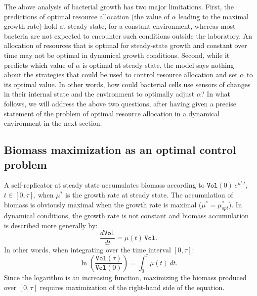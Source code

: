 The above analysis of bacterial growth has two major limitations.
First, the predictions of optimal resource allocation (the value of $\alpha$ leading to the maximal growth rate) hold at steady state, for a constant environment, whereas most bacteria are not expected to encounter such conditions outside the laboratory.
An allocation of resources that is optimal for steady-state growth and constant over time may not be optimal in dynamical growth conditions.
Second, while it predicts which value of $\alpha$ is optimal at steady state, the model says nothing about the strategies that could be used to control resource allocation and set $\alpha$ to its optimal value.
In other words, how could bacterial cells use sensors of changes in their internal state and the environment to optimally adjust $\alpha$?
In what follows, we will address the above two questions, after having given a precise statement of the problem of optimal resource allocation in a dynamical environment in the next section. 

\subsection*{Biomass maximization as an optimal control problem}
\label{sec:optimalcontrolproblem}

A self-replicator at steady state accumulates biomass according to $\texttt{Vol}(0)\, e^{\mu^*\, t}$, $t\in [0,\tau]$, when $\mu^*$ is the growth rate at steady state. 
The accumulation of biomass is obviously maximal when the growth rate is maximal ($\mu^* = \mu^*_{opt}$).
In dynamical conditions, the growth rate is not constant and biomass accumulation is described more generally by: 
\begin{equation*}
\frac{d\texttt{Vol}}{dt} = \mu(t) \, \texttt{Vol}.
\end{equation*}
In other words, when integrating over the time interval $[0,\tau]$:
\begin{equation}\label{eq:biomassdyn}
\ln \left(\frac{\texttt{Vol}(\tau)}{\texttt{Vol}(0)}\right) =  \int_{0}^{\tau} \mu(t) \, dt.
\end{equation}
Since the logarithm is an increasing function, maximizing the biomass produced over $[0,\tau]$ requires maximization of the right-hand side of the equation.

